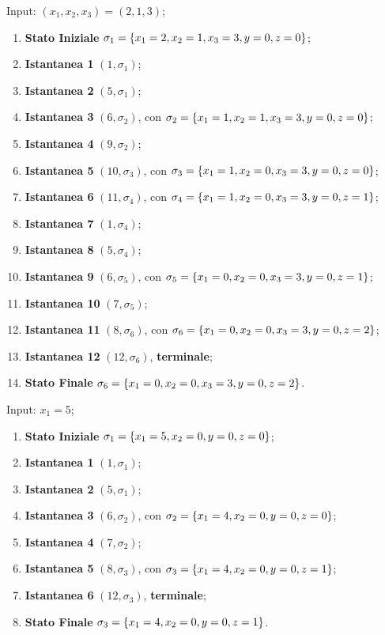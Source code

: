 Input: \((x_1,x_2,x_3)=(2,1,3)\);

\begin{enumerate}
    \item \textbf{Stato Iniziale} \(\sigma_1=\displaystyle{\left\{{x_1=2,x_2=1,x_3=3,y=0,z=0}\right\}}\);
    \item \textbf{Istantanea 1} \((1,\sigma_1)\);
    \item \textbf{Istantanea 2} \((5,\sigma_1)\);
    \item \textbf{Istantanea 3} \((6,\sigma_2)\), con \(\sigma_2=\displaystyle{\left\{{x_1=1,x_2=1,x_3=3,y=0,z=0}\right\}}\);
    \item \textbf{Istantanea 4} \((9,\sigma_2)\);
    \item \textbf{Istantanea 5} \((10,\sigma_3)\), con \(\sigma_3=\displaystyle{\left\{{x_1=1,x_2=0,x_3=3,y=0,z=0}\right\}}\);
    \item \textbf{Istantanea 6} \((11,\sigma_4)\), con \(\sigma_4=\displaystyle{\left\{{x_1=1,x_2=0,x_3=3,y=0,z=1}\right\}}\);
    \item \textbf{Istantanea 7} \((1,\sigma_4)\);
    \item \textbf{Istantanea 8} \((5,\sigma_4)\);
    \item \textbf{Istantanea 9} \((6,\sigma_5)\), con \(\sigma_5=\displaystyle{\left\{{x_1=0,x_2=0,x_3=3,y=0,z=1}\right\}}\);
    \item \textbf{Istantanea 10} \((7,\sigma_5)\);
    \item \textbf{Istantanea 11} \((8,\sigma_6)\), con \(\sigma_6=\displaystyle{\left\{{x_1=0,x_2=0,x_3=3,y=0,z=2}\right\}}\);
    \item \textbf{Istantanea 12} \((12,\sigma_6)\), \textbf{terminale};
    \item \textbf{Stato Finale} \(\sigma_6=\displaystyle{\left\{{x_1=0,x_2=0,x_3=3,y=0,z=2}\right\}}\).
\end{enumerate}

Input: \(x_1=5\);

\begin{enumerate}
    \item \textbf{Stato Iniziale} \(\sigma_1=\displaystyle{\left\{{x_1=5, x_2=0,y=0,z=0}\right\}}\);
    \item \textbf{Istantanea 1} \((1,\sigma_1)\);
    \item \textbf{Istantanea 2} \((5,\sigma_1)\);
    \item \textbf{Istantanea 3} \((6,\sigma_2)\), con \(\sigma_2=\displaystyle{\left\{{x_1=4,x_2=0,y=0,z=0}\right\}}\);
    \item \textbf{Istantanea 4} \((7,\sigma_2)\);
    \item \textbf{Istantanea 5} \((8,\sigma_3)\), con \(\sigma_3=\displaystyle{\left\{{x_1=4,x_2=0,y=0,z=1}\right\}}\);
    \item \textbf{Istantanea 6} \((12,\sigma_3)\), \textbf{terminale};
    \item \textbf{Stato Finale} \(\sigma_3=\displaystyle{\left\{{x_1=4,x_2=0,y=0,z=1}\right\}}\).
\end{enumerate}

